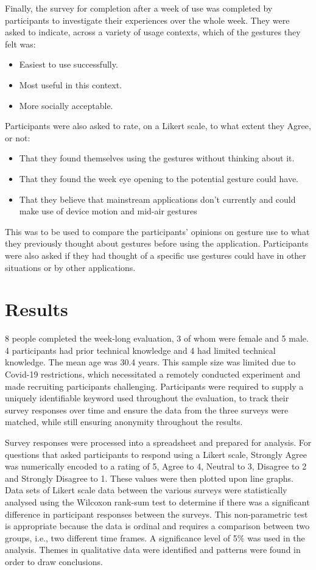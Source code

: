 \documentclass{l4proj}
\begin{document}
Finally, the survey for completion after a week of use was completed by participants to investigate their experiences over the whole week. They were asked to indicate, across a variety of usage contexts, which of the gestures they felt was:
\begin{itemize}
    \item Easiest to use successfully.
    \item Most useful in this context.
    \item More socially acceptable.
\end{itemize}
Participants were also asked to rate, on a Likert scale, to what extent they Agree, or not: 
\begin{itemize}
  \item That they found themselves using the gestures without thinking about it.
  \item That they  found the week eye opening to the potential gesture could have.
  \item That they believe that mainstream applications don't currently and could make use of device motion and mid-air gestures
\end{itemize}
This was to be used to compare the participants' opinions on gesture use to what they previously thought about gestures before using the application. Participants were also asked if they had thought of a specific use gestures could have in other situations or by other applications.


\section{Results} 
8 people completed the week-long evaluation, 3 of whom were female and 5 male. 4 participants had prior technical knowledge and 4 had limited technical knowledge. The mean age was 30.4 years. This sample size was limited due to Covid-19 restrictions, which necessitated a remotely conducted experiment and made recruiting participants challenging. Participants were required to supply a uniquely identifiable keyword used throughout the evaluation, to track their survey responses over time and ensure the data from the three surveys were matched, while still ensuring anonymity throughout the results.

Survey responses were processed into a spreadsheet and prepared for analysis. For questions that asked participants to respond using a Likert scale, Strongly Agree was numerically encoded to a rating of 5, Agree to 4, Neutral to 3, Disagree to 2 and Strongly Disagree to 1. These values were then plotted upon line graphs. Data sets of Likert scale data between the various surveys were statistically analysed using the Wilcoxon rank-sum test to determine if there was a significant difference in participant responses between the surveys. This non-parametric test is appropriate because the data is ordinal and requires a comparison between two groups, i.e., two different time frames. A significance level of 5\% was used in the analysis. Themes in qualitative data were identified and patterns were found in order to draw conclusions.
\end{document}
